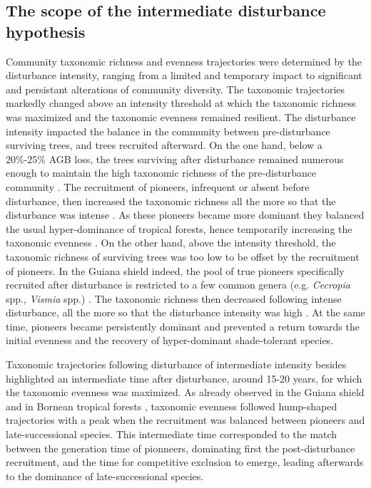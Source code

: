 \documentclass[fleqn,10pt]{ArtEcoFoG} %
\begin{document}
\subsection{The scope of the intermediate disturbance
hypothesis}\label{the-scope-of-the-intermediate-disturbance-hypothesis}

Community taxonomic richness and evenness trajectories were determined
by the disturbance intensity, ranging from a limited and temporary
impact to significant and persistant alterations of community diversity.
The taxonomic trajectories markedly changed above an intensity threshold
at which the taxonomic richness was maximized and the taxonomic evenness
remained resilient. The disturbance intensity impacted the balance in
the community between pre-disturbance surviving trees, and trees
recruited afterward. On the one hand, below a 20\%-25\% AGB loss, the
trees surviving after disturbance remained numerous enough to maintain
the high taxonomic richness of the pre-disturbance community
\citep{Bongers2009}. The recruitment of pioneers, infrequent or absent
before disturbance, then increased the taxonomic richness all the more
so that the disturbance was intense \citep{Martin2015, Chaudhary2016}.
As these pioneers became more dominant they balanced the usual
hyper-dominance of tropical forests, hence temporarily increasing the
taxonomic evenness \citep{Baraloto2012a}. On the other hand, above the
intensity threshold, the taxonomic richness of surviving trees was too
low to be offset by the recruitment of pioneers. In the Guiana shield
indeed, the pool of true pioneers specifically recruited after
disturbance is restricted to a few common genera (e.g. \emph{Cecropia}
spp., \emph{Vismia} spp.) \citep{Guitet2018}. The taxonomic richness
then decreased following intense disturbance, all the more so that the
disturbance intensity was high \citep{Molino2001}. At the same time,
pioneers became persistently dominant and prevented a return towards the
initial evenness and the recovery of hyper-dominant shade-tolerant
species.

Taxonomic trajectories following disturbance of intermediate intensity
besides highlighted an intermediate time after disturbance, around 15-20
years, for which the taxonomic evenness was maximized. As already
observed in the Guiana shield \citep{Baraloto2012a} and in Bornean
tropical forests \citep{Cannon1998}, taxonomic evenness followed
hump-shaped trajectories with a peak when the recruitment was balanced
between pioneers and late-successional species. This intermediate time
corresponded to the match between the generation time of pionneers,
dominating first the post-disturbance recruitment, and the time for
competitive exclusion to emerge, leading afterwards to the dominance of
late-successional species.
\end{document}
